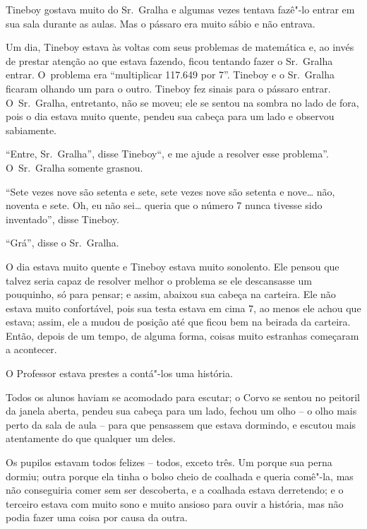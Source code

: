 

Tineboy gostava muito do Sr.~Gralha e algumas vezes tentava fazê"-lo
entrar em sua sala durante as aulas. Mas o pássaro era muito sábio e não
entrava.

Um dia, Tineboy estava às voltas com seus problemas de matemática e, ao
invés de prestar atenção ao que estava fazendo, ficou tentando fazer o
Sr.~Gralha entrar. O~problema era ``multiplicar 117.649 por 7''. Tineboy
e o Sr.~Gralha ficaram olhando um para o outro. Tineboy fez sinais para
o pássaro entrar. O~Sr.~Gralha, entretanto, não se moveu; ele se sentou
na sombra no lado de fora, pois o dia estava muito quente, pendeu sua
cabeça para um lado e observou sabiamente.

``Entre, Sr.~Gralha'', disse Tineboy``, e me ajude a resolver esse
problema''. O~Sr.~Gralha somente grasnou.

``Sete vezes nove são setenta e sete, sete vezes nove são setenta e
nove… não, noventa e sete. Oh, eu não sei… queria que o
número 7 nunca tivesse sido inventado'', disse Tineboy.

``Grá'', disse o Sr.~Gralha.

O dia estava muito quente e Tineboy estava muito sonolento. Ele pensou
que talvez seria capaz de resolver melhor o problema se ele descansasse
um pouquinho, só para pensar; e assim, abaixou sua cabeça na carteira.
Ele não estava muito confortável, pois sua testa estava em cima 7, ao menos
ele achou que estava; assim, ele a mudou de posição até que ficou bem na
beirada da carteira. Então, depois de um tempo, de alguma forma, coisas
muito estranhas começaram a acontecer.

O Professor estava prestes a contá"-los uma história.

Todos os alunos haviam se acomodado para escutar; o Corvo se sentou no
peitoril da janela aberta, pendeu sua cabeça para um lado, fechou um
olho -- o olho mais perto da sala de aula -- para que pensassem que
estava dormindo, e escutou mais atentamente do que qualquer um deles.


Os pupilos estavam todos felizes -- todos, exceto três. Um porque sua
perna dormiu; outra porque ela tinha o bolso cheio de coalhada e queria
comê"-la, mas não conseguiria comer sem ser descoberta, e a coalhada
estava derretendo; e o terceiro estava com muito sono e muito ansioso
para ouvir a história, mas não podia fazer uma coisa por causa da outra.

